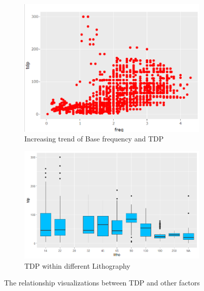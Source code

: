 \begin{figure}[!h]
\centering
    \begin{subfigure}[b]{0.49\textwidth}
        \centering
        \includegraphics[width=\textwidth]{graphics/new_graphics/Fig4.png}
        \caption{Increasing trend of Base frequency and TDP}
        \label{fig:tdp_analysis_bfreq}
    \end{subfigure}
    \begin{subfigure}[b]{0.49\textwidth}
        \centering
        \includegraphics[width=\textwidth]{graphics/boxplot_tdp_litho.png}
        \caption{TDP within different Lithography}
        \label{fig:tdp_analysis_litho}
    \end{subfigure}
    \hfill
    \caption{The relationship visualizations between TDP and other factors}
    \label{fig:tdp_analysis}
\end{figure}


